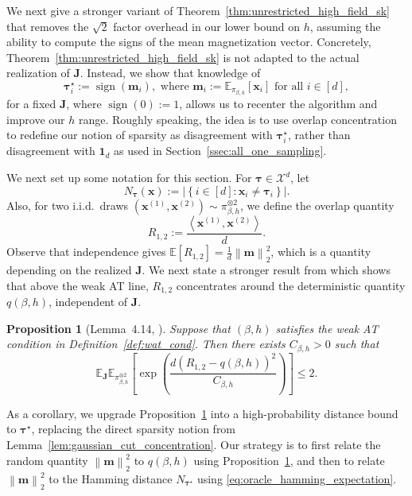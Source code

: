 \documentclass[11pt]{article}
\newtheorem{proposition}{Proposition}
\newcommand{\defeq}{:=}
\newcommand{\norm}[1]{\left\lVert#1\right\rVert}
\newcommand{\inprod}[2]{\left\langle#1, #2\right\rangle}
\newcommand{\1}{\mathbf{1}}
\newcommand{\0}{\mathbf{0}}
\newcommand{\E}{\mathbb{E}}
\newcommand{\Par}[1]{\left(#1\right)}
\newcommand{\Brack}[1]{\left[#1\right]}
\newcommand{\Brace}[1]{\left\{#1\right\}}
\newcommand{\Abs}[1]{\left|#1\right|}
\newcommand{\vtau}{\boldsymbol{\tau}}
\newcommand{\mj}{{\mathbf{J}}}
\newcommand{\vm}{{\mathbf{m}}}
\newcommand{\vx}{{\mathbf{x}}}
\newcommand{\calX}{{\mathcal{X}}}
\newcommand{\bbE}{{\mathbb{E}}}
\begin{document}
We next give a stronger variant of Theorem~\ref{thm:unrestricted_high_field_sk} that removes the $\sqrt{2}$ factor overhead in our lower bound on $h$, assuming the ability to compute the signs of the mean magnetization vector. Concretely, Theorem~\ref{thm:unrestricted_high_field_sk} is not adapted to the actual realization of $\mj$. Instead, we show that knowledge of
\[
    \vtau_i^\star
    \defeq
    \operatorname{sign}(\vm_i),\text{ where } 
    \vm_i
    \defeq
    \bbE_{\pi_{\beta,h}}\Brack{\vx_i}\text{ for all } i \in [d],
\]
for a fixed $\mj$, where $\operatorname{sign}(0) \defeq 1$, allows us to recenter the algorithm and improve our $h$ range. Roughly speaking, the idea is to use overlap concentration to redefine our notion of sparsity as disagreement with $\vtau_i^\star$, rather than disagreement with $\1_d$ as used in Section~\ref{ssec:all_one_sampling}.

We next set up some notation for this section. For
$\vtau\in\calX^d$, let
\[
    N_{\vtau}(\vx)
    \defeq
    \Abs{
        \Brace{
            i\in[d]:
            \vx_i\neq\vtau_i
        }
    }.
\]
Also, for two i.i.d.\ draws $(\vx^{(1)}, \vx^{(2)}) \sim \pi_{\beta, h}^{\otimes 2}$, we define the overlap quantity
\[R_{1, 2} \defeq \frac{\inprod{\vx^{(1)}}{\vx^{(2)}}}{d}.\]
Observe that independence gives $\E[R_{1, 2}] = \frac 1 d \norm{\vm}_2^2$, which is a quantity depending on the realized $\mj$. We next state a stronger result from \cite{rajaraman2026markov} which shows that above the weak AT line, $R_{1, 2}$ concentrates around the deterministic quantity $q(\beta, h)$, independent of $\mj$.

\begin{proposition}[Lemma~4.14, \cite{rajaraman2026markov}]
    \label{prop:wat_overlap_concentration}
    Suppose that $(\beta,h)$ satisfies the weak AT condition in
    Definition~\ref{def:wat_cond}. Then there exists
    $C_{\beta,h}>0$ such that
    \begin{equation}
        \label{eq:wat_exponential_overlap_concentration}
        \bbE_{\mj}
        \bbE_{\pi_{\beta,h}^{\otimes2}}
        \Brack{
            \exp\Par{
                \frac{
                    d
                    \Par{
                        R_{1,2}-q(\beta,h)
                    }^2
                }{
                    C_{\beta,h}
                }
            }
        }
        \le
        2.
    \end{equation}
\end{proposition}

As a corollary, we upgrade Proposition~\ref{prop:wat_overlap_concentration} into a high-probability distance bound to $\vtau^\star$, replacing the direct sparsity notion from Lemma~\ref{lem:gaussian_cut_concentration}. Our strategy is to first relate the random quantity $\norm{\vm}_2^2$ to $q(\beta, h)$ using Proposition~\ref{prop:wat_overlap_concentration}, and then to relate $\norm{\vm}_2^2$ to the Hamming distance $N_{\vtau^\star}$ using \eqref{eq:oracle_hamming_expectation}.
\end{document}
